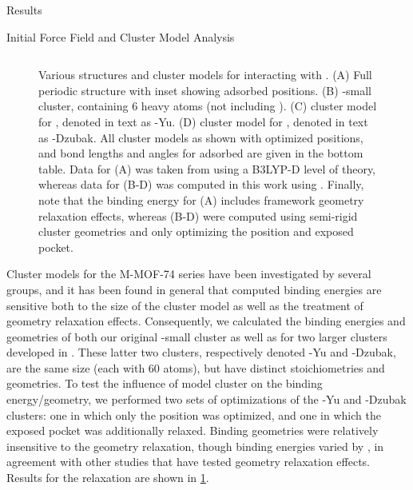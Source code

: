 \begin{section}{Results}
\begin{subsection}{Initial Force Field and Cluster Model Analysis}
\begin{figure}
\begin{tabular}{@{}lccc@{}}
    \bottomrule
    \hline
    \end{tabular}

    \caption[Model clusters for \mgmof]
{ Various structures and cluster models for \mgmof interacting with \co. 
(A) Full periodic \mgmof structure with inset showing adsorbed \co positions. 
(B) \mgmof-small cluster, containing 6 heavy atoms (not including \co). 
(C) \citeauthor{Yu2012c} cluster model for \mgmof, denoted in text as \mgmof-Yu.
(D) \citeauthor{Dzubak2012} cluster model for \mgmof, denoted in text as
\mgmof-Dzubak.
All cluster models as shown with optimized \co positions, and bond lengths and
angles for adsorbed \co are given in the bottom table. Data for (A) was taken
from \citeauthor{Valenzano2010} using a B3LYP-D level of theory,\cite{Valenzano2010}
whereas data for (B-D) was computed in this work using \pbeod. Finally, note
that the binding energy for (A) includes framework geometry relaxation effects,
whereas (B-D) were computed using semi-rigid cluster geometries and only optimizing
the \co position and exposed  pocket.
            }
    \label{fig:lmoeda-clusters}
    \end{figure}

Cluster models for the M-MOF-74 series have been investigated by several
groups, and it has been found in general that computed binding energies are
sensitive both to the size of the cluster model as well as the treatment of
geometry relaxation effects.\cite{Verma2013,Valenzano2011} Consequently, we
calculated the \co binding energies and geometries of both our original
\mgmof-small cluster as well as for two larger clusters developed in
. These latter two clusters, respectively denoted
\mgmof-Yu and \mgmof-Dzubak, are the same size (each with 60 atoms), but have
distinct stoichiometries and geometries.
To test the influence of model
cluster on the \co binding energy/geometry, we performed two sets of
optimizations of the \mgmof-Yu and \mgmof-Dzubak clusters: one in which only
the \co position was optimized, and one in which the exposed  pocket
was additionally relaxed. Binding geometries were relatively insensitive to
the geometry relaxation, though binding energies varied by , in
agreement with other studies that have tested geometry
relaxation effects.\cite{Verma2013} Results for the  relaxation are shown in
\cref{fig:lmoeda-clusters}. 


\end{subsection}
\end{section}

